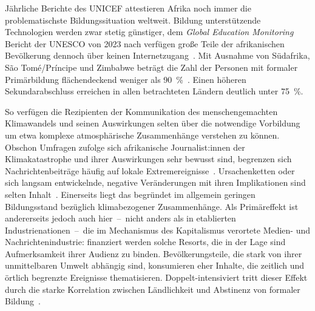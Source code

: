 Jährliche Berichte des UNICEF attestieren Afrika noch immer die problematischste Bildungssituation weltweit.
Bildung unterstützende Technologien werden zwar stetig günstiger,
dem \textit{Global Education Monitoring} Bericht der UNESCO von 2023 nach verfügen große Teile der afrikanischen Bevölkerung dennoch über keinen Internetzugang~\cite{Book.2023GEMReportSummaryTechnologyInEducationAToolOnWhoseTerms.2023}.
Mit Ausnahme von Südafrika, São Tomé/Príncipe und Zimbabwe beträgt die Zahl der Personen mit formaler Primärbildung flächendeckend weniger als \qty{90}{\percent}~\cite{Article..GlobalEducationMonitoringReport.}.
Einen höheren Sekundarabschluss erreichen in allen betrachteten Ländern deutlich unter \qty{75}{\percent}.\par\medskip

{%
\vspace{\baselineskip}
\centering

\label{fig:climate risk}
\vspace{\baselineskip}
}

So verfügen die Rezipienten der Kommunikation des menschengemachten Klimawandels und seinen Auswirkungen selten über die notwendige Vorbildung um etwa komplexe atmosphärische Zusammenhänge verstehen zu können.
Obschon Umfragen zufolge sich afrikanische Journalist:innen der Klimakatastrophe und ihrer Auswirkungen sehr bewusst sind, begrenzen sich Nachrichtenbeiträge häufig auf lokale Extremereignisse~\cite{TechReport.Lidubwi.ClimateJournalisminEastAfricaInAnEraOfMisinformation.2023}. %
Ursachenketten oder sich langsam entwickelnde, negative Veränderungen mit ihren Implikationen sind selten Inhalt~\cite{Booklet.Guedegbe.MEDIAPERCEPTIONSOFCLIMATECHANGEINSUBSAHARANAFRICA.2023}.%
Einerseits liegt das begründet im allgemein geringen Bildungsstand bezüglich klimabezogener Zusammenhänge.
Als Primäreffekt ist andererseits jedoch auch hier~--~nicht anders als in etablierten Industrienationen~--~die im Mechanismus des Kapitalismus verortete Medien- und Nachrichtenindustrie:
finanziert werden solche Resorts, die in der Lage sind Aufmerksamkeit ihrer Audienz zu binden.
Bevölkerungsteile, die stark von ihrer unmittelbaren Umwelt abhängig sind, konsumieren eher Inhalte, die zeitlich und örtlich begrenzte Ereignisse thematisieren.
Doppelt-intensiviert tritt dieser Effekt durch die starke Korrelation zwischen Ländlichkeit und Abstinenz von formaler Bildung~\cite{Article..GlobalEducationMonitoringReport.}.\par\medskip

